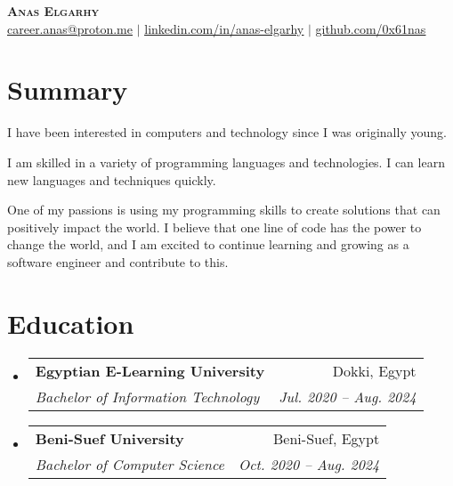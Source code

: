 \documentclass[letterpaper,11pt]{article}
\makeatletter
\newcommand{\resumeSubheading}[4]{
  \vspace{-2pt}\item
    \begin{tabular*}{0.97\textwidth}[t]{l@{\extracolsep{\fill}}r}
      \textbf{#1} & #2 \\
      \textit{\small#3} & \textit{\small #4} \\
    \end{tabular*}\vspace{-7pt}
}
\newcommand{\resumeSubHeadingListStart}{\begin{itemize}[leftmargin=0.15in, label={}]}
\newcommand{\resumeSubHeadingListEnd}{\end{itemize}}
\makeatother
\begin{document}

\begin{center}
    \textbf{\Huge \scshape Anas Elgarhy} \\ \vspace{1pt}
    \href{mailto:career.anas@proton.me}{\underline{career.anas@proton.me}} $|$ 
    \href{https://linkedin.com/in/anas-elgarhy}{\underline{linkedin.com/in/anas-elgarhy}} $|$
    \href{https://github.com/0x61nas}{\underline{github.com/0x61nas}}
\end{center}


\section{Summary}
I have been interested in computers and technology since I was originally young. \\ \vspace{4pt}

I am skilled in a variety of programming languages and technologies. I can learn new languages and techniques quickly. \\ \vspace{4pt}

One of my passions is using my programming skills to create solutions that can positively impact the world. 
I believe that one line of code has the power to change the world, and I am excited to continue learning and growing as a software engineer and contribute to this.


\section{Education}
  \resumeSubHeadingListStart
    \resumeSubheading
      {Egyptian E-Learning University}{Dokki, Egypt}
      {Bachelor of Information Technology}{Jul. 2020 -- Aug. 2024}
    \resumeSubheading
      {Beni-Suef University}{Beni-Suef, Egypt}
      {Bachelor of Computer Science}{Oct. 2020 -- Aug. 2024}
  \resumeSubHeadingListEnd
\end{document}
